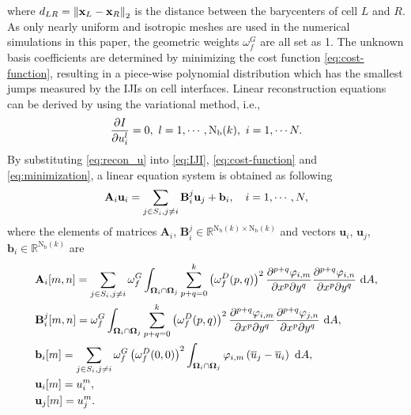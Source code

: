 where $d_{LR}= \left\| \mathbf{x}_L -\mathbf{x}_R \right\|_2$ is the distance between the barycenters of cell $L$ and $R$.
As only nearly uniform and isotropic meshes are used in the numerical simulations in this paper,
the geometric weights
$\omega^G_f$ are all set as 1.
The unknown basis coefficients are determined by minimizing the cost function \eqref{eq:cost-function}, resulting in a  piece-wise polynomial distribution which has the smallest jumps measured by the IJIs on cell interfaces.
Linear reconstruction equations can be derived by using the variational method, i.e.,
\begin{equation}
    \label{eq:minimization}
    \partialderivative{I}{u_i^l} = 0, \ l=1,\cdots, \mathrm{N_b}(k),\  i=1,\cdots N.
\end{equation}
By substituting \eqref{eq:recon_u} into \eqref{eq:IJI}, \eqref{eq:cost-function} and \eqref{eq:minimization}, a linear equation system is obtained as following
\begin{equation}
    \label{eq:vrBlockEq}
    \mathbf{A}_{i} \mathbf{u}_i
    =
    \sum_{j \in S_i, j \neq i} \mathbf{B}^j_{i} \mathbf{u}_j + \mathbf{b}_{i}, \quad i=1, \cdots, N,
\end{equation}
where the elements of matrices
$\mathbf{A}_i$, $\mathbf{B}^j_i \in \mathbb{R}^{\mathrm{N_b}(k) \times \mathrm{N_b}(k)}$
and vectors $\mathbf{u}_i$, $\mathbf{u}_j$, $\mathbf{b}_i \in \mathbb{R}^{\mathrm{N_b}(k)}$ are
\begin{equation}
    \label{eq:vrCoeffs}
    \begin{aligned}
         & \mathbf{A}_{i} [m,n]=
        \sum_{j \in S_i, j \neq i} \omega_f^G\int_{\OO_i \cap \OO_j}{
            \sum_{p+q=0}^{k}
            \left(\omega_f^D(p,q)\right)^2
            \partialderivative{^{p+q}\varphi_{i,m}}{x^p\partial y^q}
            \partialderivative{^{p+q}\varphi_{i,n}}{x^p\partial y^q}
            \ \dd A},
        \\
         & \mathbf{B}^j_{i} [m,n]=
        \omega_f^G\int_{\OO_i \cap \OO_j}{
            \sum_{p+q=0}^{k}
            \left(\omega_f^D(p,q)\right)^2
            \partialderivative{^{p+q}\varphi_{i,m}}{x^p\partial y^q}
            \partialderivative{^{p+q}\varphi_{j,n}}{x^p\partial y^q}
            \ \dd A},
        \\
         & \mathbf{b}_{i} [m]=
        \sum_{j \in S_i, j \neq i}
        \omega_f^G \left(\omega_f^D(0,0)\right)^2
        \int_{\OO_i \cap \OO_j}{
            \varphi_{i,m} \left(\overline{u}_j - \overline{u}_i\right)
            \ \dd A},
        \\
         & \mathbf{u}_i [m]= u^m_i, \\
         & \mathbf{u}_j [m]= u^m_j.
    \end{aligned}
\end{equation}
